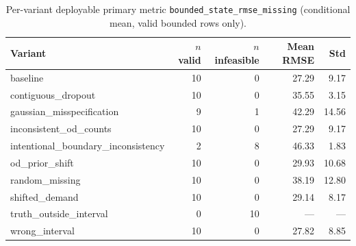 \begin{table}[t]
\centering
\caption{Per-variant deployable primary metric \texttt{bounded\_state\_rmse\_missing} (conditional mean, valid bounded rows only).}
\label{tab:variant-primary}
\footnotesize
\begin{tabular}{lrrrr}
\toprule
Variant & $n$ valid & $n$ infeasible & Mean RMSE & Std \\
\midrule
baseline & 10 & 0 & 27.29 & 9.17 \\
contiguous\_dropout & 10 & 0 & 35.55 & 3.15 \\
gaussian\_misspecification & 9 & 1 & 42.29 & 14.56 \\
inconsistent\_od\_counts & 10 & 0 & 27.29 & 9.17 \\
intentional\_boundary\_inconsistency & 2 & 8 & 46.33 & 1.83 \\
od\_prior\_shift & 10 & 0 & 29.93 & 10.68 \\
random\_missing & 10 & 0 & 38.19 & 12.80 \\
shifted\_demand & 10 & 0 & 29.14 & 8.17 \\
truth\_outside\_interval & 0 & 10 & --- & --- \\
wrong\_interval & 10 & 0 & 27.82 & 8.85 \\
\bottomrule
\end{tabular}
\end{table}
